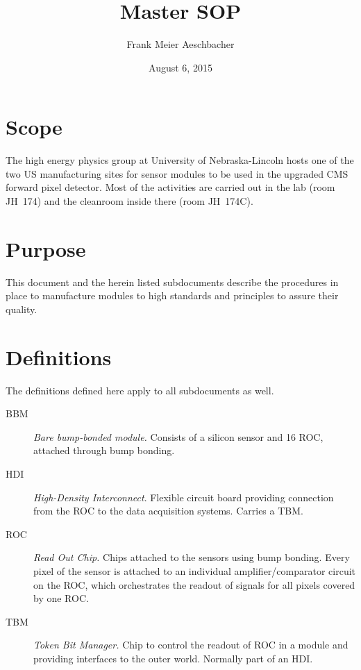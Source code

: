 \documentclass[12pt]{unlsilabsop}
\title{Master SOP}
\date{August 6, 2015}
\author{Frank Meier Aeschbacher}
\begin{document}
\maketitle

\section{Scope}
The high energy physics group at University of Nebraska-Lincoln hosts one of the two US manufacturing sites for sensor modules to be used in the upgraded CMS forward pixel detector. Most of the activities are carried out in the lab (room JH~174) and the cleanroom inside there (room JH~174C).

\section{Purpose}
This document and the herein listed subdocuments describe the procedures in place to manufacture modules to high standards and principles to assure their quality.

\section{Definitions}
The definitions defined here apply to all subdocuments as well.
\begin{description}
    \item[BBM] \emph{Bare bump-bonded module.} Consists of a silicon sensor and 16 ROC, attached through bump bonding.
    \item[HDI] \emph{High-Density Interconnect}. Flexible circuit board providing connection from the ROC to the data acquisition systems. Carries a TBM.
    \item[ROC] \emph{Read Out Chip.} Chips attached to the sensors using bump bonding. Every pixel of the sensor is attached to an individual amplifier/comparator circuit on the ROC, which orchestrates the readout of signals for all pixels covered by one ROC.
    \item[TBM] \emph{Token Bit Manager.} Chip to control the readout of ROC in a module and providing interfaces to the outer world. Normally part of an HDI.
\end{description}

\end{document}
